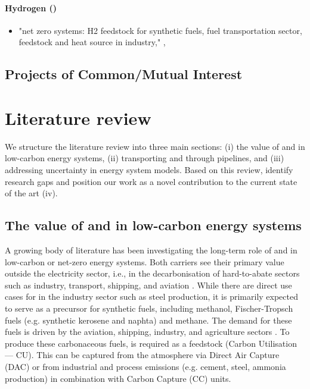 \documentclass[preprint,12pt,sort&compress]{elsarticle}
\begin{document}
\paragraph{Hydrogen ()}
\begin{itemize}
  \item "net zero systems: H2 feedstock for synthetic fuels, fuel transportation sector, feedstock and heat source in industry," \cite{greevenbroekLittleLoseCase2024}, \cite{beresWillHydrogenSynthetic2024}
\end{itemize}

\subsection{Projects of Common/Mutual Interest}


\newpage
\section{Literature review}
\label{sec:literature_review}
We structure the literature review into three main sections: (i) the value of  and  in low-carbon energy systems, (ii) transporting  and  through pipelines, and (iii) addressing uncertainty in energy system models. Based on this review, identify research gaps and position our work as a novel contribution to the current state of the art (iv).

\subsection{The value of  and  in low-carbon energy systems}
A growing body of literature has been investigating the long-term role of  and  in low-carbon or net-zero energy systems. Both carriers see their primary value outside the electricity sector, i.e., in the decarbonisation of hard-to-abate sectors such as industry, transport, shipping, and aviation \cite{reigstadMovingLowcarbonHydrogen2022}. While there are direct use cases for  in the industry sector such as steel production, it is primarily expected to serve as a precursor for synthetic fuels, including methanol, Fischer-Tropsch fuels (e.g. synthetic kerosene and naphta) and methane. The demand for these fuels is driven by the aviation, shipping, industry, and agriculture sectors \cite{neumannPotentialRoleHydrogen2023}. To produce these carbonaceous fuels,  is required as a feedstock (Carbon Utilisation --- CU). This  can be captured from the atmosphere via Direct Air Capture (DAC) or from industrial and process emissions (e.g. cement, steel, ammonia production) in combination with Carbon Capture (CC) units.
\end{document}
